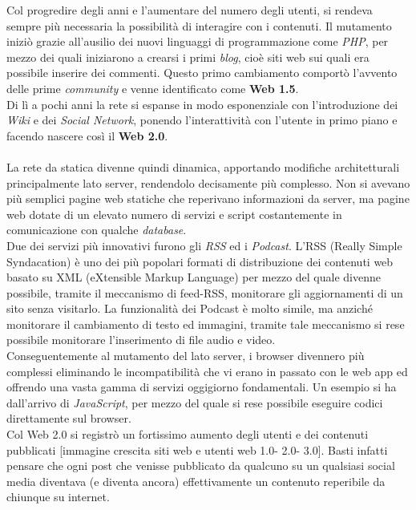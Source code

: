 \documentclass[a4paper, 11pt, oneside]{book}
\theoremstyle{plain}
\begin{document}
Col progredire degli anni e l'aumentare del numero degli utenti, si rendeva sempre più necessaria la possibilità di interagire con i contenuti. Il mutamento iniziò grazie all'ausilio dei nuovi linguaggi di programmazione come \textit{PHP}, per mezzo dei quali iniziarono a crearsi i primi \textit{blog}, cioè siti web sui quali era possibile inserire dei commenti. Questo primo cambiamento comportò l'avvento delle prime \textit{community} e venne identificato come \textbf{Web 1.5}. \\Di lì a pochi anni la rete si espanse in modo esponenziale con l'introduzione dei \textit{Wiki} e dei \textit{Social Network}, ponendo l'interattività con l'utente in primo piano e facendo nascere così il\textbf{ Web 2.0}.\\\\
La rete da statica divenne quindi dinamica, apportando modifiche architetturali principalmente lato server, rendendolo decisamente più complesso. Non si avevano più semplici pagine web statiche che reperivano informazioni da server, ma pagine web dotate di un elevato numero di servizi e script costantemente in comunicazione con qualche \textit{database}. \\ Due dei servizi più innovativi furono gli \textit{RSS} ed i \textit{Podcast}. L'RSS (Really Simple Syndacation) è uno dei più popolari formati di distribuzione dei contenuti web basato su XML (eXtensible Markup Language) per mezzo del quale divenne possibile, tramite il meccanismo di feed-RSS, monitorare gli aggiornamenti di un sito senza visitarlo. La funzionalità dei Podcast è molto simile, ma anziché monitorare il cambiamento di testo ed immagini, tramite tale meccanismo si rese possibile monitorare l'inserimento di file audio e video.\\
Conseguentemente al mutamento del lato server, i browser divennero  più complessi eliminando le incompatibilità che vi erano in passato con le web app ed offrendo una vasta gamma di servizi oggigiorno fondamentali. Un esempio si ha dall'arrivo di \textit{JavaScript}, per mezzo del quale si rese possibile eseguire codici direttamente sul browser. \\ Col Web 2.0 si registrò un fortissimo aumento degli utenti e dei contenuti pubblicati [immagine crescita siti web e utenti web 1.0- 2.0- 3.0]. Basti infatti pensare che ogni post che venisse pubblicato da qualcuno su un qualsiasi social media diventava (e diventa ancora) effettivamente un contenuto reperibile da chiunque su internet.\\\\
\end{document}
